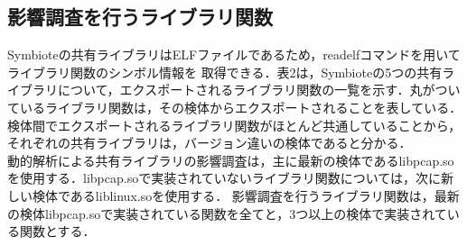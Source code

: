 \documentclass[submit,techreq,noauthor]{eco}	%
\begin{document}
\subsection{影響調査を行うライブラリ関数}
Symbioteの共有ライブラリはELFファイルであるため，readelfコマンドを用いてライブラリ関数のシンボル情報を
取得できる．表2は，Symbioteの5つの共有ライブラリについて，エクスポートされるライブラリ関数の一覧を示す．丸がついているライブラリ関数は，その検体からエクスポートされることを表している．
検体間でエクスポートされるライブラリ関数がほとんど共通していることから，それぞれの共有ライブラリは，バージョン違いの検体であると分かる．\\
動的解析による共有ライブラリの影響調査は，主に最新の検体であるlibpcap.soを使用する．libpcap.soで実装されていないライブラリ関数については，次に新しい検体であるliblinux.soを使用する．
影響調査を行うライブラリ関数は，最新の検体libpcap.soで実装されている関数を全てと，3つ以上の検体で実装されている関数とする．\\
\end{document}
